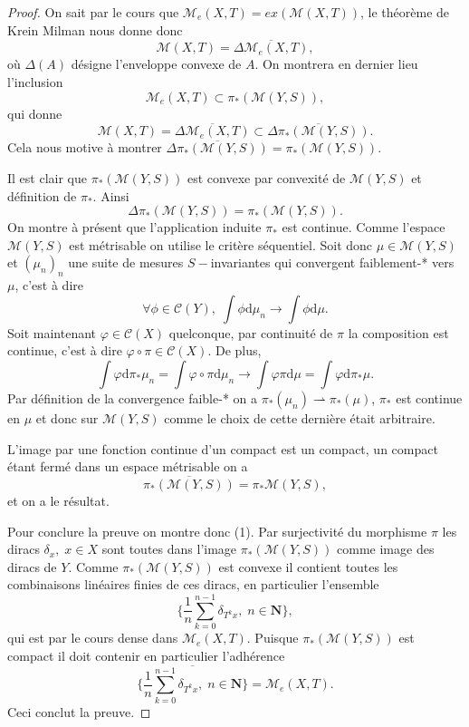 \documentclass[12pt]{article}
\newcommand{\N}{\mathbf{N}}
\newcommand{\de}{\mathrm{d}}
\begin{document}
\begin{proof}
\medskip

On sait par le cours que $\mathcal{M}_{e}(X,T) = ex(\mathcal{M}(X,T))$, le théorème de Krein Milman nous donne donc \[
        \mathcal{M}(X,T) = \overline{\Delta\mathcal{M}_{e}(X,T)}
        ,\] où $\Delta(A)$ désigne l'enveloppe convexe de $A$. On montrera en dernier lieu l'inclusion 
\begin{equation}
        \mathcal{M}_{e}(X,T) \subset \pi_{*}(\mathcal{M}(Y,S)),
\end{equation}
        qui donne \[
        \mathcal{M}(X,T) = \overline{\Delta\mathcal{M}_{e}(X,T)} \subset \overline{\Delta\pi_{*}(\mathcal{M}(Y,S))}
.\] Cela nous motive à montrer $\overline{\Delta\pi_{*}(\mathcal{M}(Y,S))} = \pi_{*}(\mathcal{M}(Y,S))$.

\medskip

Il est clair que $\pi_{*}(\mathcal{M}(Y,S))$ est convexe par convexité de $\mathcal{M}(Y,S)$ et définition de $\pi_{*}$. Ainsi \[
        \Delta\pi_{*}(\mathcal{M}(Y,S)) = \pi_{*}(\mathcal{M}(Y,S))
.\] 
On montre à présent que l'application induite $\pi_{*}$ est continue. Comme l'espace $\mathcal{M}(Y,S)$ est métrisable on utilise le critère séquentiel. Soit donc $\mu \in \mathcal{M}(Y,S)$ et $(\mu_{n})_{n}$ une suite de mesures $S-$invariantes qui convergent faiblement-* vers $\mu$, c'est à dire  \[
        \forall \phi \in \mathcal{C}(Y), \; \int\phi\de\mu_{n} \to \int\phi\de\mu
.\] 
Soit maintenant $\varphi \in \mathcal{C}(X)$ quelconque, par continuité de $\pi$ la composition est continue, c'est à dire $\varphi \circ \pi \in \mathcal{C}(X)$. De plus, \[
\int\varphi\de\pi_{*}\mu_{n} = \int\varphi\circ\pi\de\mu_{n} \to \int\varphi\pi\de\mu = \int\varphi\de\pi_{*}\mu
.\] Par définition de la convergence faible-* on a $\pi_{*}(\mu_{n}) \rightharpoonup \pi_{*}(\mu)$, $\pi_{*}$ est continue en $\mu$ et donc sur  $\mathcal{M}(Y,S)$ comme le choix de cette dernière était arbitraire.

L'image par une fonction continue d'un compact est un compact, un compact étant fermé dans un espace métrisable on a \[
        \overline{\pi_{*}(\mathcal{M}(Y,S))} = \pi_{*}\mathcal{M}(Y,S)
,\] et on a le résultat.

\medskip

Pour conclure la preuve on montre donc (1). Par surjectivité du morphisme $\pi$ les diracs $\delta_{x}, \; x \in X$ sont toutes dans l'image $\pi_{*}(\mathcal{M}(Y,S))$ comme image des diracs de $Y$. Comme $\pi_{*}(\mathcal{M}(Y,S))$ est convexe il contient toutes les combinaisons linéaires finies de ces diracs, en particulier l'ensemble \[
        \{\frac{1}{n}\sum_{k=0}^{n-1} \delta_{T^{k}x}, \; n \in \N\} 
,\] qui est par le cours dense dans $\mathcal{M}_{e}(X,T)$. Puisque $\pi_{*}(\mathcal{M}(Y,S))$ est compact il doit contenir en particulier l'adhérence \[
\overline{\{\frac{1}{n}\sum_{k=0}^{n-1} \delta_{T^{k}x}, \; n \in \N\}} = \mathcal{M}_{e}(X,T)
.\] Ceci conclut la preuve. 

\newpage

\end{proof}
\end{document}
